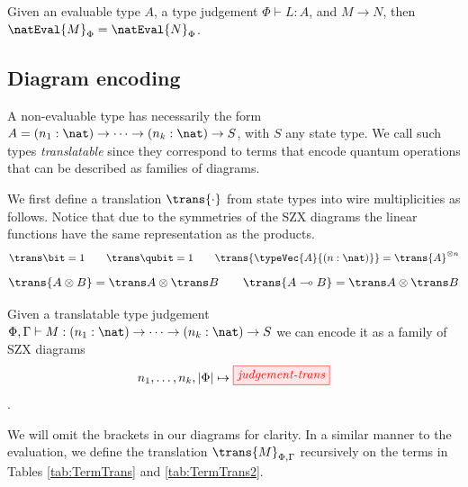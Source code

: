 \begin{lemma}%
    \label{lem:eval-reduction}
    Given an evaluable type $A$,
    a type judgement $\Phi \vdash L : A$, and $M \to N$, then $\natEval{M}_\Phi = \natEval{N}_\Phi$.
\end{lemma}

\subsection{Diagram encoding}

A non-evaluable type has necessarily the form $A = (n_1:\nat) \to \dots \to (n_k:\nat) \to S$,
with $S$ any state type.
We call such types \textit{translatable} since they correspond to terms that
encode quantum operations that can be described as families of diagrams.

We first define a translation $\trans{\cdot}$ from state types
into wire multiplicities as follows.
Notice that due to the symmetries of the SZX diagrams
the linear functions have the same representation as the products.
\[
    \trans\bit = 1
    \qquad
    \trans\qubit = 1
    \qquad
    \trans{\typeVec{A}{(n: \nat)}} = \trans{A}^{\otimes n}
\]
\[
    \trans{A \otimes B} = \trans A \otimes \trans B
    \qquad
    \trans{A \multimap B} = \trans A \otimes \trans B
\]

Given a translatable type judgement
$\Phi, \Gamma \vdash M : (n_1:\nat) \to \dots \to (n_k:\nat) \to S$
we can encode it as a family of SZX diagrams
\[
  n_1, \dots, n_k, |\Phi| \mapsto \tikzfig{judgement-trans}
\].

We will omit the brackets in our diagrams for clarity. In a similar manner to the evaluation, we define the translation $\trans{M}_{\Phi,\Gamma}$ recursively on the terms in Tables \ref{tab:TermTrans} and \ref{tab:TermTrans2}.

